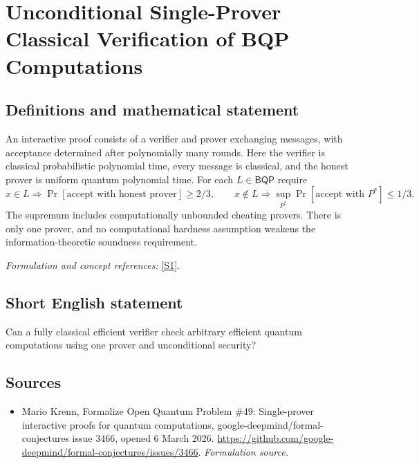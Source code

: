 \documentclass[11pt]{article}
\begin{document}
\section*{\texorpdfstring{Unconditional Single-Prover Classical Verification of BQP Computations}{Unconditional Single-Prover Classical Verification of BQP Computations}}\label{statement}
\subsection{Definitions and mathematical statement}
An interactive proof consists of a verifier and prover exchanging messages, with acceptance determined after polynomially many rounds. Here the verifier is classical probabilistic polynomial time, every message is classical, and the honest prover is uniform quantum polynomial time. For each $L\in\mathsf{BQP}$ require
\[
 x\in L\Rightarrow\Pr[\text{accept with honest prover}]\ge2/3,\qquad
 x\notin L\Rightarrow\sup_{P^*}\Pr[\text{accept with }P^*]\le1/3.
\]
The supremum includes computationally unbounded cheating provers. There is only one prover, and no computational hardness assumption weakens the information-theoretic soundness requirement.
\par\smallskip\textit{Formulation and concept references:} \href{https://github.com/google-deepmind/formal-conjectures/issues/3466}{[S1]}.

\subsection{Short English statement}
Can a fully classical efficient verifier check arbitrary efficient quantum computations using one prover and unconditional security?
\subsection{Sources}
\begin{itemize}
\item[S1]Mario Krenn, Formalize Open Quantum Problem \#49: Single-prover interactive proofs for quantum computations, google-deepmind/formal-conjectures issue 3466, opened 6 March 2026.
\url{https://github.com/google-deepmind/formal-conjectures/issues/3466}.
\textit{Formulation source.}
\end{itemize}
\end{document}
